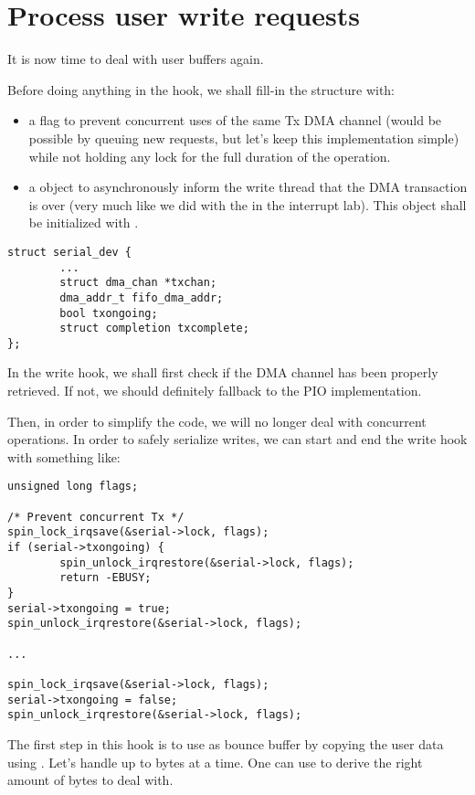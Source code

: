 \section{Process user write requests}

It is now time to deal with user buffers again.

Before doing anything in the  hook, we shall fill-in the
 structure with:
\begin{itemize}
\item a  flag to prevent concurrent uses of the same
  Tx DMA channel (would be possible by queuing new requests, but let's keep this
  implementation simple) while not holding any lock for the full duration of
  the operation.
\item a  object to asynchronously inform the
  write thread that the DMA transaction is over (very much like we did with the
   in the interrupt lab). This object shall be initialized with
  .
\end{itemize}

\begin{verbatim}
struct serial_dev {
        ...
        struct dma_chan *txchan;
        dma_addr_t fifo_dma_addr;
        bool txongoing;
        struct completion txcomplete;
};
\end{verbatim}

In the write hook, we shall first check if the DMA channel has been
properly retrieved. If not, we should definitely fallback to the PIO
implementation.

Then, in order to simplify the code, we will no longer deal with
concurrent operations. In order to safely serialize writes, we can start
and end the write hook with something like:

\begin{verbatim}
unsigned long flags;

/* Prevent concurrent Tx */
spin_lock_irqsave(&serial->lock, flags);
if (serial->txongoing) {
        spin_unlock_irqrestore(&serial->lock, flags);
        return -EBUSY;
}
serial->txongoing = true;
spin_unlock_irqrestore(&serial->lock, flags);

...

spin_lock_irqsave(&serial->lock, flags);
serial->txongoing = false;
spin_unlock_irqrestore(&serial->lock, flags);
\end{verbatim}

The first step in this  hook is to use  as
bounce buffer by copying the user data using . Let's
handle up to  bytes at a time. One can use 
to derive the right amount of bytes to deal with.

